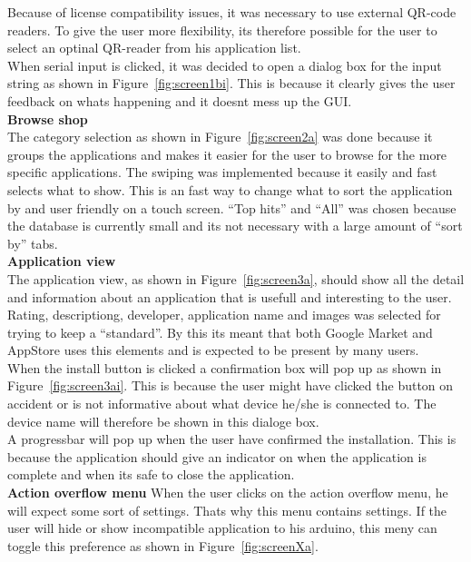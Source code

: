 	Because of license compatibility issues, it was necessary to use external QR-code readers. To give the user more flexibility, its therefore possible for the user to select an optinal QR-reader from his application list.\\

	When serial input is clicked, it was decided to open a dialog box for the input string as shown in Figure~\ref{fig:screen1bi}. This is because it clearly gives the user feedback on whats happening and it doesnt mess up the GUI.\\

	\textbf{Browse shop}\\
	The category selection as shown in Figure~\ref{fig:screen2a} was done because it groups the applications and makes it easier for the user to browse for the more specific applications. The swiping was implemented because it easily and fast selects what to show. This is an fast way to change what to sort the application by and user friendly on a touch screen. ``Top hits'' and ``All'' was chosen because the database is currently small and its not necessary with a large amount of ``sort by'' tabs.\\

	\textbf{Application view}\\
	The application view, as shown in Figure~\ref{fig:screen3a}, should show all the detail and information about an application that is usefull and interesting to the user. Rating, descriptiong, developer, application name and images was selected for trying to keep a ``standard''. By this its meant that both Google Market and AppStore uses this elements and is expected to be present by many users.\\

	When the install button is clicked a confirmation box will pop up as shown in Figure~\ref{fig:screen3ai}. This is because the user might have clicked the button on accident or is not informative about what device he/she is connected to. The device name will therefore be shown in this dialoge box.\\

	A progressbar will pop up when the user have confirmed the installation. This is because the application should give an indicator on when the application is complete and when its safe to close the application. \\

	\textbf{Action overflow menu}
	When the user clicks on the action overflow menu, he will expect some sort of settings. Thats why this menu contains settings. If the user will hide or show incompatible application to his arduino, this meny can toggle this preference as shown in Figure~\ref{fig:screenXa}.\\

